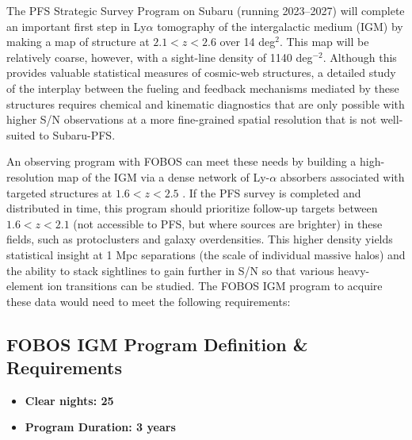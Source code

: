 \documentclass[11pt,a4paper,twoside,onecolumn,openany,final,oldfontcommands]{memoir}
\begin{document}

The PFS Strategic Survey Program on Subaru (running 2023--2027) \citep{Nagamine:2020_tomography} will complete an important first step in Ly$\alpha$ tomography of the intergalactic medium (IGM) by making a map of structure at $2.1 < z < 2.6$ over 14 deg$^2$.  This map will be relatively coarse, however, with a sight-line density of 1140 deg$^{-2}$.  Although this provides valuable statistical measures of cosmic-web structures, a detailed study of the interplay between the fueling and feedback mechanisms mediated by these structures requires chemical and kinematic diagnostics that are only possible with higher S/N observations at a more fine-grained spatial resolution that is not well-suited to Subaru-PFS.


An observing program with FOBOS can meet these needs by building a high-resolution map of the IGM via a dense network of Ly-$\alpha$ absorbers associated with targeted structures at $1.6 < z < 2.5$ \citep[see][]{lee16}.  If the PFS survey is completed and distributed in time, this program should prioritize follow-up targets between $1.6 < z < 2.1$ (not accessible to PFS, but where sources are brighter) in these fields, such as protoclusters and galaxy overdensities.  This higher density yields statistical insight at 1 Mpc separations (the scale of individual massive halos) and the ability to stack sightlines to gain further in S/N so that various heavy-element ion transitions can be studied.  The FOBOS IGM program to acquire these data would need to meet the following requirements:

\subsection{FOBOS IGM Program Definition \& Requirements}

\medskip
\begin{itemize}[leftmargin=0.3in, itemsep=0pt]
	\item[] \textbf{Clear nights: 25}
	\item[] \textbf{Program Duration: 3 years}
\end{itemize}
\end{document}
